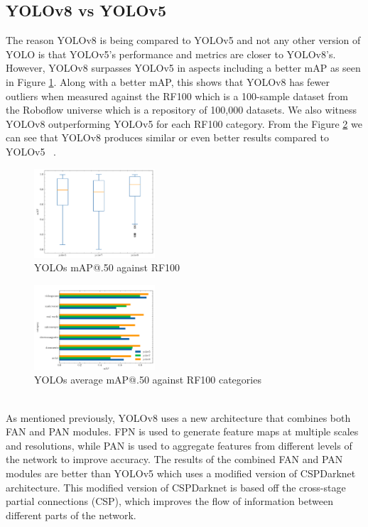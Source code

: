 \documentclass[10pt,twocolumn,letterpaper]{article}
\begin{document}
\subsection{YOLOv8 vs YOLOv5}
The reason YOLOv8 is being compared to YOLOv5 and not any other version of YOLO is that YOLOv5’s performance and metrics are closer to YOLOv8’s. However, YOLOv8 surpasses YOLOv5 in aspects including a better mAP as seen in Figure \ref{fig:YOLOv8_mAP}. Along with a better mAP, this shows that YOLOv8 has fewer outliers when measured against the RF100 which is a 100-sample dataset from the Roboflow universe which is a repository of 100,000 datasets. We also witness YOLOv8 outperforming YOLOv5 for each RF100 category. From the Figure \ref{fig:YOLOv8_average_mAP_against_cats} we can see that YOLOv8 produces similar or even better results compared to YOLOv5 ~\cite{YOLOv8Website}.
\begin{figure}[h]
    \centering
    \includegraphics[width=0.4\textwidth]{figures/YOLOv5_vs_YOLOv8_COMP1.png}
    \caption{YOLOs mAP@.50 against RF100 ~\cite{YOLOv8Website}}
    \label{fig:YOLOv8_mAP}
\end{figure}
\begin{figure}[h]
    \centering
    \includegraphics[width=0.4\textwidth]{figures/YOLOv5_vs_YOLOv8_COMP2.png}
    \caption{YOLOs average mAP@.50 against RF100 categories ~\cite{YOLOv8Website}}
    \label{fig:YOLOv8_average_mAP_against_cats}
\end{figure}
\\
As mentioned previously, YOLOv8 uses a new architecture that combines both FAN and PAN modules. FPN is used to generate feature maps at multiple scales and resolutions, while PAN is used to aggregate features from different levels of the network to improve accuracy. The results of the combined FAN and PAN modules are better than YOLOv5 which uses a modified version of CSPDarknet architecture. This modified version of CSPDarknet is based off the cross-stage partial connections (CSP), which improves the flow of information between different parts of the network.\\  
\end{document}
